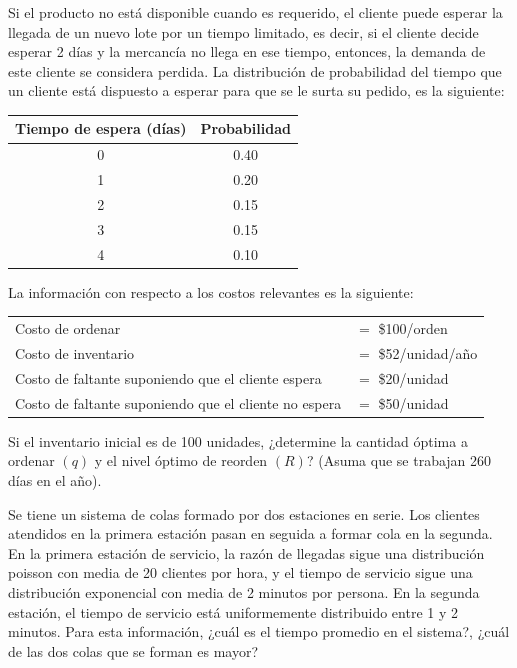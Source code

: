\documentclass[11pt,letterpaper]{report}
\begin{document}
\begin{description}[leftmargin=1.2cm,style=nextline]
Si el producto no está disponible cuando es requerido, el cliente puede
esperar la llegada de un nuevo lote por un tiempo limitado, es decir, si el
cliente decide esperar 2 días y la mercancía no llega en ese tiempo,
entonces, la demanda de este cliente se considera perdida. La distribución de
probabilidad del tiempo que un cliente está dispuesto a esperar para que se
le surta su pedido, es la siguiente:

\begin{center}
\begin{tabular}{cc}
Tiempo de espera (días) & Probabilidad \\
\midrule
0 & 0.40 \\
1 & 0.20 \\
2 & 0.15 \\
3 & 0.15 \\
4 & 0.10 \\
\end{tabular}
\end{center}

La información con respecto a los costos relevantes es la siguiente:
\begin{center}
\begin{tabular}{ll}
Costo de ordenar & $=$ \$100/orden \\
Costo de inventario & $=$ \$52/unidad/año \\
Costo de faltante suponiendo que el cliente espera & $=$ \$20/unidad \\
Costo de faltante suponiendo que el cliente no espera & $=$ \$50/unidad \\
\end{tabular}
\end{center}

Si el inventario inicial es de 100 unidades, ¿determine la cantidad óptima a
ordenar $(q)$ y el nivel óptimo de reorden $(R)$? (Asuma que se trabajan 260
días en el año).

\item[5.12.] Se tiene un sistema de colas formado por dos estaciones en
serie. Los clientes atendidos en la primera estación pasan en seguida a
formar cola en la segunda. En la primera estación de servicio, la razón de
llegadas sigue una distribución poisson con media de 20 clientes por hora, y
el tiempo de servicio sigue una distribución exponencial con media de 2
minutos por persona. En la segunda estación, el tiempo de servicio está
uniformemente distribuido entre 1 y 2 minutos. Para esta información, ¿cuál
es el tiempo promedio en el sistema?, ¿cuál de las dos colas que se forman es
mayor?


\end{description}
\end{document}
